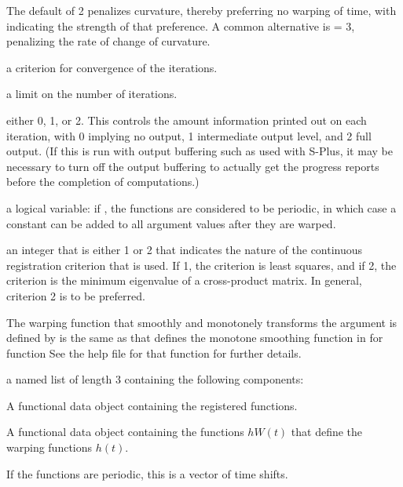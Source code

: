 \begin{Arguments}
\begin{ldescription}
The default  of 2 penalizes curvature, thereby
preferring no warping of time, with  indicating the
strength of that preference.  A common alternative is 
= 3, penalizing the rate of change of curvature.   

\item[\code{conv}] a criterion for convergence of the iterations.

\item[\code{iterlim}] a limit on the number of iterations.

\item[\code{dbglev}] either 0, 1, or 2.  This controls the amount information printed out
on each iteration, with 0 implying no output, 1 intermediate output
level, and 2 full output.  (If this is run with output buffering
such as used with S-Plus, it may be necessary to turn off the output
buffering to actually get the progress reports before the completion
of computations.)  

\item[\code{periodic}] a logical variable:  if , the functions are considered to
be periodic, in which case a constant can be added to all argument
values after they are warped. 

\item[\code{crit}] an integer that is either 1 or 2 that indicates the nature of the
continuous registration criterion that is used.  If 1, the criterion is
least squares, and if 2, the criterion is the minimum eigenvalue of a
cross-product matrix.  In general, criterion 2 is to be preferred.

\end{ldescription}
\end{Arguments}
\begin{Details}\relax
The warping function that smoothly and monotonely transforms the
argument is defined by  is the same as that defines the
monotone smoothing function in for function 
See the help file for that function for further details.
\end{Details}
\begin{Value}
a named list of length 3 containing the following components:

\begin{ldescription}
\item[\code{regfd}] A functional data object containing the registered functions.

\item[\code{Wfd}] A functional data object containing the functions $h W(t)$
that define the warping functions $h(t)$.

\item[\code{shift}] If the functions are periodic, this is a vector of time shifts.

\end{ldescription}
\end{Value}
